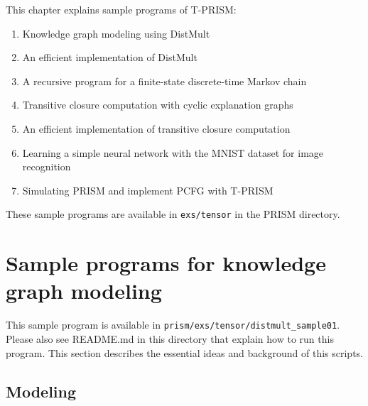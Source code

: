 \documentclass[a4paper]{report}
\begin{document}
This chapter explains sample programs of T-PRISM:
\begin{enumerate}
\item Knowledge graph modeling using DistMult  \cite{Yang15}
\item An efficient implementation of DistMult
\item A recursive program for a  finite-state discrete-time  Markov chain
\item Transitive closure computation with cyclic explanation graphs
\item An efficient implementation of transitive closure computation
\item Learning a simple neural network with the MNIST dataset \cite{lecun1998mnist} for image recognition
\item Simulating PRISM and implement PCFG with T-PRISM
\end{enumerate}
These sample programs are available in \verb|exs/tensor| in the PRISM directory.

\section{Sample programs for knowledge graph modeling}
\label{sec:distmult01}

This sample program is available in \verb|prism/exs/tensor/distmult_sample01|.
Please also see README.md in this directory that explain how to run  this program.
This section describes the essential ideas and background of this scripts. 

\subsection*{Modeling}
\end{document}
